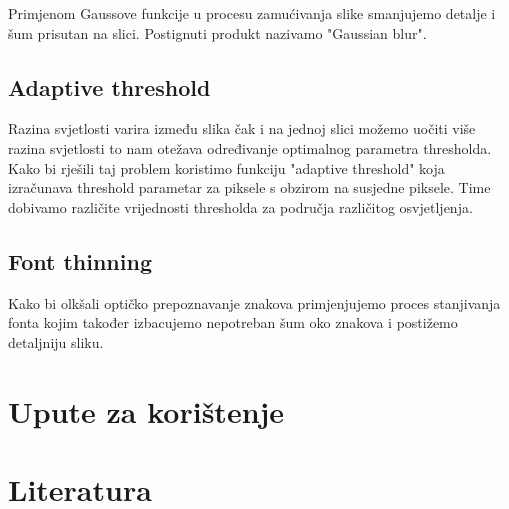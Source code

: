\documentclass{article}
\begin{document}
Primjenom Gaussove funkcije u procesu zamućivanja slike smanjujemo detalje i šum prisutan na slici. Postignuti produkt nazivamo "Gaussian blur". %

\subsection{Adaptive threshold}

Razina svjetlosti varira između slika čak i na jednoj slici možemo uočiti više razina svjetlosti to nam otežava određivanje optimalnog parametra thresholda. \\ Kako bi rješili taj problem koristimo funkciju "adaptive threshold" koja izračunava threshold parametar za piksele s obzirom na susjedne piksele. Time dobivamo različite vrijednosti thresholda za područja različitog osvjetljenja.

\subsection{Font thinning}

Kako bi olkšali optičko prepoznavanje znakova primjenjujemo proces stanjivanja fonta kojim također izbacujemo nepotreban šum oko znakova i postižemo detaljniju sliku. %

\section{Upute za korištenje}
\section{Literatura}
\end{document}
